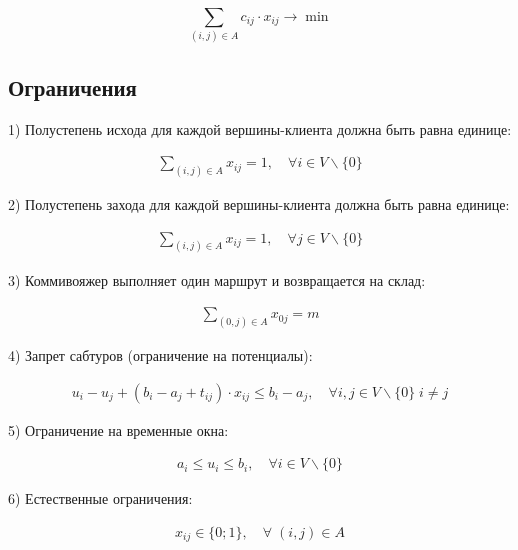 \documentclass[14pt,fleqn]{extarticle}
\begin{document}
	\[ \sum_{(i,j) \in A} c_{ij} \cdot x_{ij} \longrightarrow \min \]
	
	\subsection*{Ограничения}
	
	1) Полустепень исхода для каждой вершины-клиента должна быть равна единице:
	
	\begin{ceqn}
		\begin{align*}
			\sum_{(i,j) \in A} x_{ij} = 1, \quad \forall i \in V\backslash\{0\}
		\end{align*}
	\end{ceqn}

	2) Полустепень захода для каждой вершины-клиента должна быть равна единице:
	
	\begin{ceqn}
		\begin{align*}
			\sum_{(i,j) \in A} x_{ij} = 1, \quad \forall j \in V\backslash\{0\}
		\end{align*}
	\end{ceqn}

	\newpage

	3) Коммивояжер выполняет один маршрут и возвращается на склад:
	
	\begin{ceqn}
		\begin{align*}
			\sum_{(0,j) \in A} x_{0j} = m
		\end{align*}
	\end{ceqn}

	4) Запрет сабтуров (ограничение на потенциалы):

	\begin{ceqn}
		\begin{align*}
			u_i - u_j + (b_i - a_j + t_{ij}) \cdot x_{ij} \leq b_i - a_j, \quad \forall i, j \in V\backslash\{0\} \; i \neq j
		\end{align*}
	\end{ceqn}
	
	5) Ограничение на временные окна:
	
	\begin{ceqn}
		\begin{align*}
			a_i \leq u_i \leq b_i, \quad \forall i \in V\backslash\{0\}
		\end{align*}
	\end{ceqn}

	6) Естественные ограничения:
	\begin{ceqn}
		\begin{align*}
			x_{ij} \in \{0;1\}, \quad \forall \; (i,j) \in A
		\end{align*}
	\end{ceqn}
\end{document}
